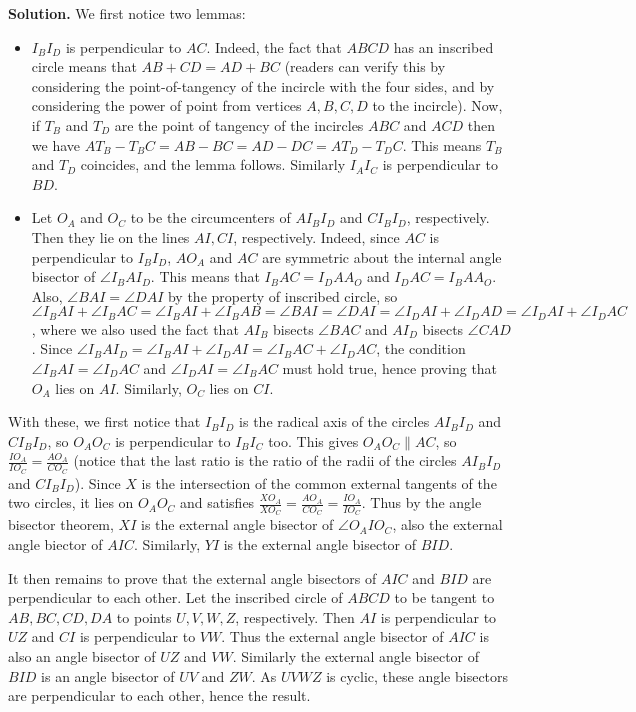 \documentclass[11pt,a4paper]{article}
\begin{document}
\begin{enumerate}
	\textbf{Solution.} We first notice two lemmas: 
	\begin{itemize}
		\item $I_BI_D$ is perpendicular to $AC$. Indeed, the fact that $ABCD$ has an inscribed circle means that $AB+CD=AD+BC$ (readers can verify this by considering the point-of-tangency of the incircle with the four sides, and by considering the power of point from vertices $A, B, C, D$ to the incircle). Now, if $T_B$ and $T_D$ are the point of tangency of the incircles $ABC$ and $ACD$ then we have $AT_B-T_BC=AB-BC=AD-DC=AT_D-T_DC$. This means $T_B$ and $T_D$ coincides, and the lemma follows. Similarly $I_AI_C$ is perpendicular to $BD$. 
		\item Let $O_A$ and $O_C$ to be the circumcenters of $AI_BI_D$ and $CI_BI_D$, respectively. Then they lie on the lines $AI, CI$, respectively. Indeed, since $AC$ is perpendicular to $I_BI_D$, $AO_A$ and $AC$ are symmetric about the internal angle bisector of $\angle I_BAI_D$. This means that $I_BAC=I_DAA_O$ and $I_DAC=I_BAA_O$. Also, $\angle BAI=\angle DAI$ by the property of inscribed circle, so $\angle I_BAI+\angle I_BAC=\angle I_BAI+\angle I_BAB=\angle BAI=\angle DAI=\angle I_DAI+\angle I_DAD=\angle I_DAI+\angle I_DAC$, where we also used the fact that $AI_B$ bisects $\angle BAC$ and $AI_D$ bisects $\angle CAD$. Since $\angle I_BAI_D=\angle I_BAI+\angle I_DAI=\angle I_BAC+\angle I_DAC$, the condition $\angle I_BAI=\angle I_DAC$ and $\angle I_DAI=\angle I_BAC$ must hold true, hence proving that $O_A$ lies on $AI$. Similarly, $O_C$ lies on $CI$. 
	\end{itemize}
    With these, we first notice that $I_BI_D$ is the radical axis of the circles $AI_BI_D$ and $CI_BI_D$, so $O_AO_C$ is perpendicular to $I_BI_C$ too. This gives $O_AO_C\parallel AC$, so $\frac{IO_A}{IO_C}=\frac{AO_A}{CO_C}$ (notice that the last ratio is the ratio of the radii of the circles $AI_BI_D$ and $CI_BI_D$). Since $X$ is the intersection of the common external tangents of the two circles, it lies on $O_AO_C$ and satisfies $\frac{XO_A}{XO_C}=\frac{AO_A}{CO_C}=\frac{IO_A}{IO_C}$. Thus by the angle bisector theorem, $XI$ is the external angle bisector of $\angle O_AIO_C$, also the external angle biector of $AIC$. Similarly, $YI$ is the external angle bisector of $BID$. 
    
    It then remains to prove that the external angle bisectors of $AIC$ and $BID$ are perpendicular to each other. Let the inscribed circle of $ABCD$ to be tangent to $AB, BC, CD, DA$ to points $U, V, W, Z$, respectively. Then $AI$ is perpendicular to $UZ$ and $CI$ is perpendicular to $VW$. Thus the external angle bisector of $AIC$ is also an angle bisector of $UZ$ and $VW$. Similarly the external angle bisector of $BID$ is an angle bisector of $UV$ and $ZW$. As $UVWZ$ is cyclic, these angle bisectors are perpendicular to each other, hence the result. 
	\end{enumerate}
\end{document}
